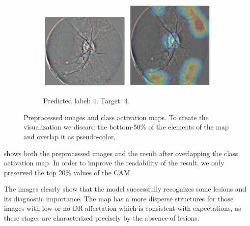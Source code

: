 \begin{figure}[tb]
\begin{subfigure}[b]{0.49\textwidth}
    \end{subfigure}
    \hfill
    \begin{subfigure}[b]{0.49\textwidth}
         \centering
         \includegraphics[width=0.49\textwidth,height=0.49\textwidth]{figures/chapter6/heatmaps/43716_left.png}
        \includegraphics[width=0.49\textwidth,height=0.49\textwidth]{figures/chapter6/heatmaps/43716_left_heatmap.png}
        \caption{Predicted label: 4. Target: 4.}

     \end{subfigure}
     \centering
     \caption{Preprocessed images and class activation maps. To create the visualization we discard the bottom-50\% of the elements of the map and overlap it as pseudo-color.}
     \label{fig:heatmap}
\end{figure}

 shows both the preprocessed images and the result after overlapping the class activation map. In order to improve the readability of the result, we only preserved the top 20\% values of the CAM.

The images clearly show that the model successfully recognizes some lesions and its diagnostic importance. The map has a more disperse structures for those images with low or no DR affectation which is consistent with expectations, as these stages are characterized precisely by the absence of lesions.

